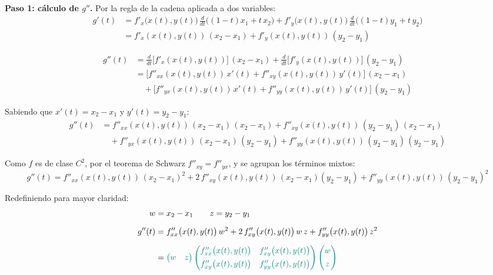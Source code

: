 \documentclass{article}
\begin{document}
\medskip
\noindent\textbf{Paso 1: cálculo de \(g''\).} Por la regla de la cadena aplicada a dos variables:
\[
\begin{aligned}
g'(t)
&= f'_x\bigl(x(t),y(t)\bigr)\,\frac{d}{dt}\bigl((1-t)x_1 + t\,x_2\bigr)
 + f'_y\bigl(x(t),y(t)\bigr)\,\frac{d}{dt}\bigl((1-t)y_1 + t\,y_2\bigr)\\[4pt]
&= f'_x(x(t),y(t))\,(x_2 - x_1)
 + f'_y(x(t),y(t))\,(y_2 - y_1)
\end{aligned}
\]

\[
\begin{aligned}
g''(t)
&= \frac{d}{dt}\bigl[f'_x(x(t),y(t))\bigr]\,(x_2 - x_1)
 + \frac{d}{dt}\bigl[f'_y(x(t),y(t))\bigr]\,(y_2 - y_1)\\[6pt]
&= \bigl[f''_{xx}(x(t),y(t))\,x'(t)
        + f''_{xy}(x(t),y(t))\,y'(t)\bigr]\,(x_2 - x_1)\\
&\quad
 + \bigl[f''_{yx}(x(t),y(t))\,x'(t)
        + f''_{yy}(x(t),y(t))\,y'(t)\bigr]\,(y_2 - y_1)
\end{aligned}
\]

Sabiendo que \(x'(t)=x_2-x_1\) y \(y'(t)=y_2-y_1\):
\[
\begin{aligned}
g''(t)
&= f''_{xx}(x(t),y(t))\,(x_2 - x_1)\,(x_2 - x_1)
+ f''_{xy}(x(t),y(t))\,(y_2 - y_1)\,(x_2 - x_1)\\
&\quad
+ f''_{yx}(x(t),y(t))\,(x_2 - x_1)\,(y_2 - y_1)
+ f''_{yy}(x(t),y(t))\,(y_2 - y_1)\,(y_2 - y_1)
\end{aligned}
\]

Como \(f\) es de clase \(C^2\), por el teorema de Schwarz \(f''_{xy}=f''_{yx}\), y se agrupan los términos mixtos:
\[
g''(t)
= f''_{xx}(x(t),y(t))\,(x_2 - x_1)^2
+ 2\,f''_{xy}(x(t),y(t))\,(x_2 - x_1)(y_2 - y_1)
+ f''_{yy}(x(t),y(t))\,(y_2 - y_1)^2
\]

Redefiniendo para mayor claridad:
\[
\begin{aligned}
w &= x_2 - x_1
\qquad
z = y_2 - y_1\\[6pt]
g''(t)
&= f''_{xx}\bigl(x(t),y(t)\bigr)\,w^2
 + 2\,f''_{xy}\bigl(x(t),y(t)\bigr)\,w\,z
 + f''_{yy}\bigl(x(t),y(t)\bigr)\,z^2\\[6pt]
&= \color{teal}
\begin{pmatrix}w & z\end{pmatrix}
\begin{pmatrix}
f''_{xx}\bigl(x(t),y(t)\bigr) & f''_{xy}\bigl(x(t),y(t)\bigr)\\[4pt]
f''_{xy}\bigl(x(t),y(t)\bigr) & f''_{yy}\bigl(x(t),y(t)\bigr)
\end{pmatrix}
\begin{pmatrix}w\\[4pt]z\end{pmatrix}
\end{aligned}
\]
\end{document}

